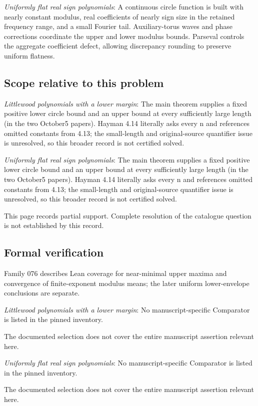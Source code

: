 \documentclass[11pt]{article}
\begin{document}
\textit{Uniformly flat real sign polynomials}: A continuous circle function is built with nearly constant modulus, real coefficients of nearly sign size in the retained frequency range, and a small Fourier tail. Auxiliary-torus waves and phase corrections coordinate the upper and lower modulus bounds. Parseval controls the aggregate coefficient defect, allowing discrepancy rounding to preserve uniform flatness.

\subsection{Scope relative to this problem}
\textit{Littlewood polynomials with a lower margin}: The main theorem supplies a fixed positive lower circle bound and an upper bound at every sufficiently large length (in the two October5 papers). Hayman 4.14 literally asks every n and references omitted constants from 4.13; the small-length and original-source quantifier issue is unresolved, so this broader record is not certified solved.

\textit{Uniformly flat real sign polynomials}: The main theorem supplies a fixed positive lower circle bound and an upper bound at every sufficiently large length (in the two October5 papers). Hayman 4.14 literally asks every n and references omitted constants from 4.13; the small-length and original-source quantifier issue is unresolved, so this broader record is not certified solved.

This page records partial support. Complete resolution of the catalogue question is not established by this record.

\subsection{Formal verification}
Family 076 describes Lean coverage for near-minimal upper maxima and convergence of finite-exponent modulus means; the later uniform lower-envelope conclusions are separate.

\textit{Littlewood polynomials with a lower margin}: No manuscript-specific Comparator is listed in the pinned inventory.

The documented selection does not cover the entire manuscript assertion relevant here.

\textit{Uniformly flat real sign polynomials}: No manuscript-specific Comparator is listed in the pinned inventory.

The documented selection does not cover the entire manuscript assertion relevant here.
\end{document}

